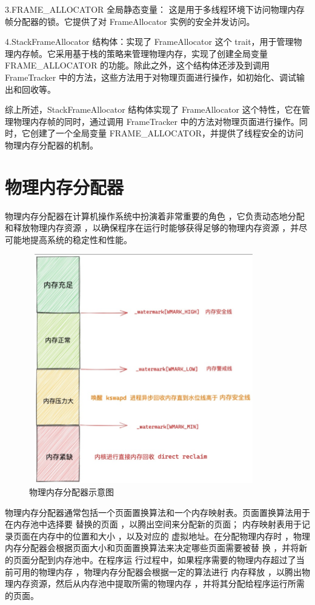  3.FRAME\_ALLOCATOR 全局静态变量： 这是用于多线程环境下访问物理内存帧分配器的锁。它提供了对 FrameAllocator 实例的安全并发访问。

 4.StackFrameAllocator 结构体：实现了 FrameAllocator 这个 trait，用于管理物理内存帧。它采用基于栈的策略来管理物理内存，实现了创建全局变量FRAME\_ALLOCATOR 的功能。除此之外，这个结构体还涉及到调用 FrameTracker 中的方法，这些方法用于对物理页面进行操作，如初始化、调试输出和回收等。

 综上所述，StackFrameAllocator 结构体实现了 FrameAllocator 这个特性，它在管理物理内存帧的同时，通过调用 FrameTracker 中的方法对物理页面进行操作。同时，它创建了一个全局变量 FRAME\_ALLOCATOR，并提供了线程安全的访问物理内存分配器的机制。

 
	\section{物理内存分配器}
	物理内存分配器在计算机操作系统中扮演着非常重要的角色 ，它负责动态地分配和释放物理内存资源 ，以确保程序在运行时能够获得足够的物理内存资源 ，并尽可能地提高系统的稳定性和性能。
	\begin{figure}[h]
		\centering
		\includegraphics[width=10cm,height=10cm]{figures/04-03-物理内存分配器示意图.png}
		\caption{物理内存分配器示意图}
	\end{figure}   
 
	物理内存分配器通常包括一个页面置换算法和一个内存映射表。页面置换算法用于在内存池中选择要 替换的页面 ，以腾出空间来分配新的页面； 内存映射表用于记录页面在内存中的位置和大小 ，以及对应的 虚拟地址。在分配物理内存时 ，物理内存分配器会根据页面大小和页面置换算法来决定哪些页面需要被替 换 ，并将新的页面分配到内存池中。在程序运 行过程中，如果程序需要的物理内存超过了当前可用的物理内存 ，物理内存分配器会根据一定的算法进行 内存释放 ，以腾出物理内存资源，然后从内存池中提取所需的物理内存 ，并将其分配给程序运行所需的页面。

